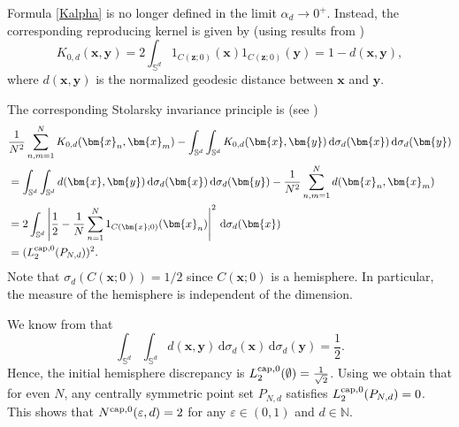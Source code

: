 \documentclass[12pt]{article}
\newcommand{\cp}{{\rm cap}}
\begin{document}
Formula \eqref{Kalpha} is no longer defined in the limit $\alpha_d \to 0^+$. Instead, the corresponding reproducing kernel is given by (using results from \cite{BDM18})
\begin{equation*}
K_{0,d}(\bm{x}, \bm{y}) = 2 \int_{\mathbb{S}^d} 1_{C(\bm{z}; 0)}(\bm{x}) 1_{C(\bm{z}; 0)}(\bm{y}) =   1 - d(\bm{x}, \bm{y}),
\end{equation*}
where $d(\bm{x}, \bm{y})$ is the normalized geodesic distance between $\bm{x}$ and $\bm{y}$. 




The corresponding Stolarsky invariance principle is (see \cite[Theorem~3.1]{BDM18})
\begin{align*}
& \frac{1}{N^2} \sum_{n,m=1}^N K_{0,d}(\bm{x}_n, \bm{x}_m) - \int_{\mathbb{S}^d} \int_{\mathbb{S}^d} K_{0,d}(\bm{x}, \bm{y}) \,\mathrm{d} \sigma_d(\bm{x}) \,\mathrm{d} \sigma_d(\bm{y}) \\
& =  \int_{\mathbb{S}^d} \int_{\mathbb{S}^d} d(\bm{x}, \bm{y}) \,\mathrm{d} \sigma_d(\bm{x}) \,\mathrm{d} \sigma_d(\bm{y}) - \frac{1}{N^2} \sum_{n,m=1}^N d(\bm{x}_n, \bm{x}_m)  \\ & = 2 \int_{\mathbb{S}^d} \left| \frac{1}{2} - \frac{1}{N} \sum_{n=1}^N 1_{C(\bm{x}; 0)}(\bm{x}_n) \right|^2 \,\mathrm{d} \sigma_d(\bm{x})\\
& = (L_2^{\cp,0}(P_{N,d}))^2.
\end{align*}
Note that $\sigma_d(C(\bm{x}; 0)) = 1/2$ since $C(\bm{x}; 0)$ is a hemisphere. In particular, the measure of the hemisphere is independent of the dimension.

We know from \cite{BDM18} that 
\begin{equation*}
\int_{\mathbb{S}^d} \int_{\mathbb{S}^d} d(\bm{x}, \bm{y}) \,\mathrm{d} \sigma_d(\bm{x}) \,\mathrm{d} \sigma_d(\bm{y}) = \frac{1}{2}.
\end{equation*}
Hence, the initial hemisphere discrepancy is $L_2^{\cp,0}(\emptyset) = \frac{1}{\sqrt{2}}$. Using \cite[Theorem~3.2]{BDM18} we obtain that for even $N$, any centrally symmetric point set $P_{N,d}$ satisfies $L_2^{\cp,0}(P_{N,d}) = 0$. This shows that $N^{\cp,0}(\varepsilon, d)= 2$ for any $\varepsilon \in (0,1)$ and $d \in \mathbb{N}$. 
\end{document}
